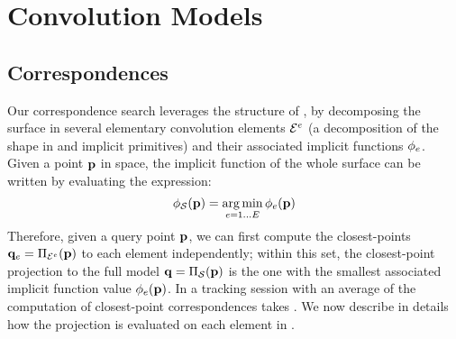 \section{Convolution Models}

\subsection{Correspondences}
\label{sec:corresp}
Our correspondence search leverages the structure of , by decomposing the surface in several elementary convolution elements $\mathcal{E}^e$ (a decomposition of the shape in  and  implicit primitives) and their associated implicit functions $\phi_e$. Given a point $\mathbf{p}$ in space, the implicit function of the whole surface can be written by evaluating the expression:
\begin{equation}
\phi_{\mathcal{S}}(\mathbf{p}) = \operatorname*{arg\,min}_{e=1 \dots E} \phi_e(\mathbf{p})
\label{eq:piecewise}
\end{equation}
Therefore, given a query point $\mathbf{p}$, we can first compute the closest-points $\mathbf{q}_e = \Pi_{\mathcal{E}^e}(\mathbf{p})$ to each element independently; within this set, the closest-point projection to the full model $\mathbf{q} = \Pi_{\mathcal{S}}(\mathbf{p})$ is the one with the smallest associated implicit function value $\phi_e(\mathbf{p})$. In a tracking session with an average of  the computation of closest-point correspondences takes . We now describe in details how the projection is evaluated on each element in . 


